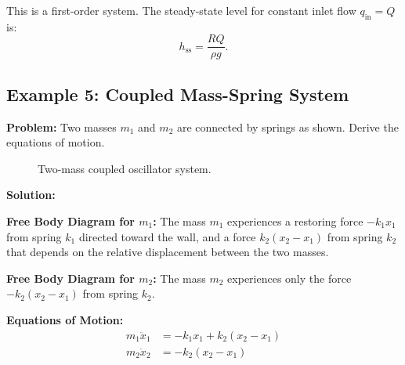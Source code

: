 This is a first-order system. The steady-state level for constant inlet flow $q_{\text{in}} = Q$ is:
\begin{equation}
h_{\text{ss}} = \frac{RQ}{\rho g}.
\end{equation}

\hrulefill

\subsection{Example 5: Coupled Mass-Spring System}

\textbf{Problem:} Two masses $m_1$ and $m_2$ are connected by springs as shown. Derive the equations of motion.

\begin{figure}[htbp]
\centering
{}
\caption{Two-mass coupled oscillator system.}
\label{fig:coupled_mass}
\end{figure}

\textbf{Solution:}

\textbf{Free Body Diagram for $m_1$:} The mass $m_1$ experiences a restoring force $-k_1 x_1$ from spring $k_1$ directed toward the wall, and a force $k_2(x_2 - x_1)$ from spring $k_2$ that depends on the relative displacement between the two masses.

\textbf{Free Body Diagram for $m_2$:} The mass $m_2$ experiences only the force $-k_2(x_2 - x_1)$ from spring $k_2$.

\textbf{Equations of Motion:}
\begin{align}
m_1\ddot{x}_1 &= -k_1 x_1 + k_2(x_2 - x_1) \\
m_2\ddot{x}_2 &= -k_2(x_2 - x_1)
\end{align}

